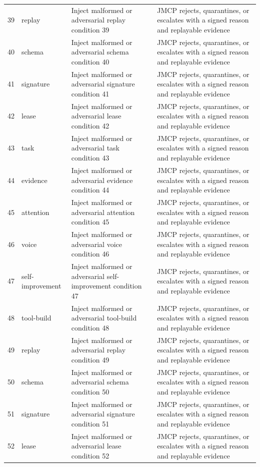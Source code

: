 \documentclass[10pt,journal,onecolumn]{IEEEtran}
\begin{document}
\begin{longtable}{P{0.05\textwidth} P{0.16\textwidth} P{0.38\textwidth} P{0.33\textwidth}}
39 & replay & Inject malformed or adversarial replay condition 39 & JMCP rejects, quarantines, or escalates with a signed reason and replayable evidence \\
40 & schema & Inject malformed or adversarial schema condition 40 & JMCP rejects, quarantines, or escalates with a signed reason and replayable evidence \\
41 & signature & Inject malformed or adversarial signature condition 41 & JMCP rejects, quarantines, or escalates with a signed reason and replayable evidence \\
42 & lease & Inject malformed or adversarial lease condition 42 & JMCP rejects, quarantines, or escalates with a signed reason and replayable evidence \\
43 & task & Inject malformed or adversarial task condition 43 & JMCP rejects, quarantines, or escalates with a signed reason and replayable evidence \\
44 & evidence & Inject malformed or adversarial evidence condition 44 & JMCP rejects, quarantines, or escalates with a signed reason and replayable evidence \\
45 & attention & Inject malformed or adversarial attention condition 45 & JMCP rejects, quarantines, or escalates with a signed reason and replayable evidence \\
46 & voice & Inject malformed or adversarial voice condition 46 & JMCP rejects, quarantines, or escalates with a signed reason and replayable evidence \\
47 & self-improvement & Inject malformed or adversarial self-improvement condition 47 & JMCP rejects, quarantines, or escalates with a signed reason and replayable evidence \\
48 & tool-build & Inject malformed or adversarial tool-build condition 48 & JMCP rejects, quarantines, or escalates with a signed reason and replayable evidence \\
49 & replay & Inject malformed or adversarial replay condition 49 & JMCP rejects, quarantines, or escalates with a signed reason and replayable evidence \\
50 & schema & Inject malformed or adversarial schema condition 50 & JMCP rejects, quarantines, or escalates with a signed reason and replayable evidence \\
51 & signature & Inject malformed or adversarial signature condition 51 & JMCP rejects, quarantines, or escalates with a signed reason and replayable evidence \\
52 & lease & Inject malformed or adversarial lease condition 52 & JMCP rejects, quarantines, or escalates with a signed reason and replayable evidence \\

\end{longtable}
\end{document}

